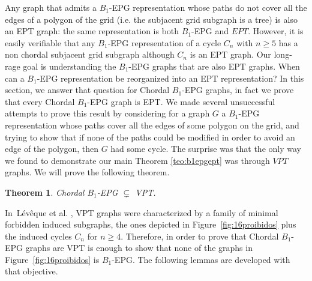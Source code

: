 \documentclass[9pt]{entcs}
\newtheorem{teo}{Theorem}[section]
\newcommand{\la}[1]{\textcolor{blue}{\sf{#1}}}%
\begin{document}
 Any graph that
admits a $B_1$-EPG representation  whose paths do not cover all the edges of a polygon of the grid (i.e.
the subjacent grid subgraph is a tree)  is also an EPT graph: the same representation is both $B_1$-EPG and $EPT$.
However, it is easily verifiable that any $B_1$-EPG representation of a \la{chordless} cycle $C_n$ with $n\geq 5$
has a non chordal subjacent grid subgraph although $C_n$ is an  EPT graph.  Our long-rage goal is 
understanding the $B_1$-EPG graphs that are also EPT graphs. When can a $B_1$-EPG representation
be reorganized into an EPT representation?  In this section,
 we answer that question for Chordal $B_1$-EPG graphs, in fact we prove that every Chordal $B_1$-EPG graph is EPT. We
 made several unsuccessful attempts to prove this result by considering for a graph $G$ a $B_1$-EPG representation whose paths cover all the edges
 of some polygon on the grid, and trying  to show  that if none of the paths could be modified in order to avoid an edge of the polygon,
 then $G$ had some \la{induced} cycle. The surprise was that the only way we found to demonstrate our main Theorem \ref{teo:b1epgept} was through $VPT$ graphs.
 We will prove the following theorem.

\begin{teo}\label{teo:chordalB1inVPT}
Chordal $B_1$-EPG $\subsetneq$ VPT. 
\end{teo}

In~L{\'e}v{\^e}que et al. \cite{leveque2009characterizing} \la{apud} \cite{alcon2015characterizing},  VPT graphs were characterized by a family of minimal forbidden induced subgraphs,
the ones depicted in 
Figure~\ref{fig:16proibidos} plus the induced cycles $C_n$ for $n\geq 4$. Therefore, in order to prove
that Chordal $B_1$-EPG graphs are VPT is enough to show that none of the graphs in Figure~\ref{fig:16proibidos} 
is $B_1$-EPG. The following lemmas are developed with that objective.   



 

\end{document}
